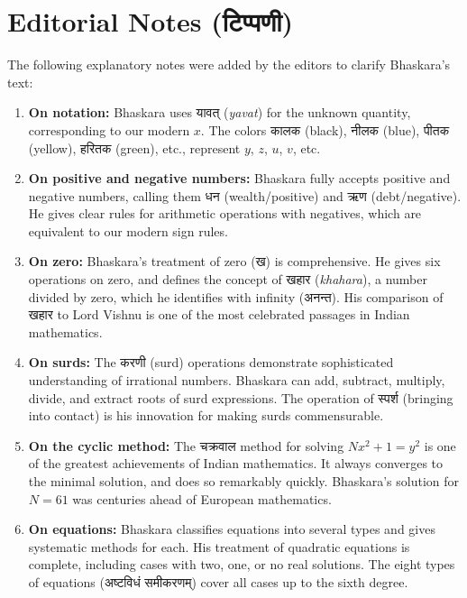 \documentclass[11pt,a4paper]{article}
\newcommand{\dev}[1]{{\devanagarifont #1}}
\begin{document}
\vspace{1cm}

\section*{Editorial Notes (\dev{टिप्पणी})}

The following explanatory notes were added by the editors to clarify Bhaskara's text:

\vspace{0.3cm}

\begin{enumerate}[leftmargin=2em]
  \item \textbf{On notation:} Bhaskara uses \dev{यावत्} (\textit{yavat}) for the unknown quantity, corresponding to our modern $x$. The colors \dev{कालक} (black), \dev{नीलक} (blue), \dev{पीतक} (yellow), \dev{हरितक} (green), etc., represent $y$, $z$, $u$, $v$, etc.

  \item \textbf{On positive and negative numbers:} Bhaskara fully accepts positive and negative numbers, calling them \dev{धन} (wealth/positive) and \dev{ऋण} (debt/negative). He gives clear rules for arithmetic operations with negatives, which are equivalent to our modern sign rules.

  \item \textbf{On zero:} Bhaskara's treatment of zero (\dev{ख}) is comprehensive. He gives six operations on zero, and defines the concept of \dev{खहार} (\textit{khahara}), a number divided by zero, which he identifies with infinity (\dev{अनन्त}). His comparison of \dev{खहार} to Lord Vishnu is one of the most celebrated passages in Indian mathematics.

  \item \textbf{On surds:} The \dev{करणी} (surd) operations demonstrate sophisticated understanding of irrational numbers. Bhaskara can add, subtract, multiply, divide, and extract roots of surd expressions. The operation of \dev{स्पर्श} (bringing into contact) is his innovation for making surds commensurable.

  \item \textbf{On the cyclic method:} The \dev{चक्रवाल} method for solving $Nx^2 + 1 = y^2$ is one of the greatest achievements of Indian mathematics. It always converges to the minimal solution, and does so remarkably quickly. Bhaskara's solution for $N = 61$ was centuries ahead of European mathematics.

  \item \textbf{On equations:} Bhaskara classifies equations into several types and gives systematic methods for each. His treatment of quadratic equations is complete, including cases with two, one, or no real solutions. The eight types of equations (\dev{अष्टविधं समीकरणम्}) cover all cases up to the sixth degree.
\end{enumerate}
\end{document}
